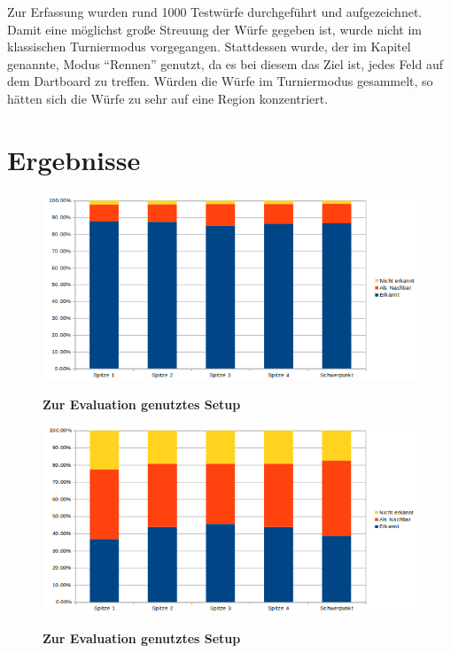 Zur Erfassung wurden rund 1000  Testwürfe durchgeführt und aufgezeichnet. Damit eine möglichst große Streuung der Würfe gegeben ist, wurde nicht im klassischen Turniermodus vorgegangen. Stattdessen wurde, der im Kapitel  genannte, Modus "`Rennen"' genutzt, da es bei diesem das Ziel ist, jedes Feld auf dem Dartboard zu treffen. Würden die Würfe im Turniermodus gesammelt, so hätten sich die Würfe zu sehr auf eine Region konzentriert.
\section{Ergebnisse}
\label{sec:results}
\begin{figure}[ht]
\centering
\includegraphics[width=\textwidth]{media/chartplain}\\
\caption{\textbf{Zur Evaluation genutztes Setup}}
\label{Fig:testsetup}
\end{figure}
\begin{figure}[ht]
\centering
\includegraphics[width=\textwidth]{media/chartonlycovert}\\
\caption{\textbf{Zur Evaluation genutztes Setup}}
\label{Fig:testsetup}
\end{figure}
